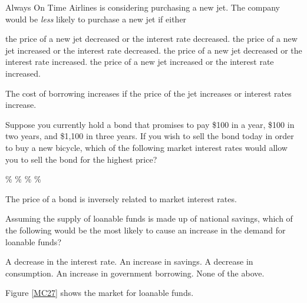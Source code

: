 \documentclass[addpoints,11pt]{exam}
\theoremstyle{definition}
\begin{document}
\begin{questions}
\question Always On Time Airlines is considering purchasing a new jet. The company would be \textit{less} likely to purchase a new jet if either

\begin{choices}
	\choice the price of a new jet decreased or the interest rate decreased.
	\choice the price of a new jet increased or the interest rate decreased.
	\choice the price of a new jet decreased or the interest rate increased.
	\CorrectChoice the price of a new jet increased or the interest rate increased.
\end{choices}

\begin{solution}
	The cost of borrowing increases if the price of the jet increases or interest rates increase.
\end{solution}


	
	\question Suppose you currently hold a bond that promises to pay \$100 in a year, \$100 in two years, and \$1,100 in three years. If you wish to sell the bond today in order to buy a new bicycle, which of the following market interest rates would allow you to sell the bond for the highest price?
	
	\begin{choices}
		\%
		\%
		\%
		\%
	\end{choices}
	
\begin{solution}
	The price of a bond is inversely related to market interest rates.
\end{solution}

\question Assuming the supply of loanable funds is made up of national savings, which of the following would be the most likely to cause an increase in the demand for loanable funds?

\begin{choices}
	\choice A decrease in the interest rate.
	\choice An increase in savings.
	\choice A decrease in consumption.
	\choice An increase in government borrowing.
	\CorrectChoice None of the above.
\end{choices}

	\question Figure \ref{MC27} shows the market for loanable funds. 
	

\end{questions}
\end{document}
